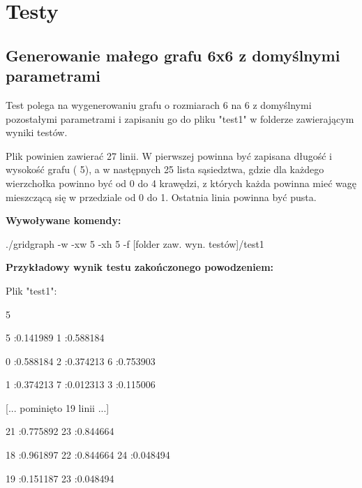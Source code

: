 \documentclass[11pt,a4paper]{report}
\def\console #1{\begingroup\fontfamily{qcr}\selectfont#1\endgroup}
\newenvironment{multiconsole}{\begingroup\fontfamily{qcr}\selectfont}{\endgroup}
\begin{document}
    \chapter{Testy}
    


    \newpage
    \section{Generowanie małego grafu 6x6 z domyślnymi parametrami}

    Test polega na wygenerowaniu grafu o rozmiarach 6 na 6 z domyślnymi pozostałymi parametrami i zapisaniu go do pliku "test1" w folderze zawierającym wyniki testów. 
    
    Plik powinien zawierać 27 linii. W pierwszej powinna być zapisana długość i wysokość grafu (\console{5 5}), a w następnych 25 lista sąsiedztwa, gdzie dla każdego wierzchołka powinno być od 0 do 4 krawędzi, z których każda powinna mieć wagę mieszczącą się w przedziale od 0 do 1. Ostatnia linia powinna być pusta.

    \vspace{2em}

    \textbf{Wywoływane komendy:}

    \vspace{1em}

    \begin{multiconsole}
        ./gridgraph -w -xw 5 -xh 5 -f [folder zaw. wyn. testów]/test1
    \end{multiconsole}

    \vspace{2em}

    \textbf{Przykładowy wynik testu zakończonego powodzeniem:}

    \vspace{1em}

    Plik "test1":

    \begin{multiconsole}
        5 5

        \hspace{2em}5 :0.141989  1 :0.588184 

        \hspace{2em}0 :0.588184  2 :0.374213  6 :0.753903 

        \hspace{2em}1 :0.374213  7 :0.012313  3 :0.115006 

        [... pominięto 19 linii ...]

        \hspace{2em}21 :0.775892  23 :0.844664 

        \hspace{2em}18 :0.961897  22 :0.844664  24 :0.048494 

        \hspace{2em}19 :0.151187  23 :0.048494
    \end{multiconsole}
\end{document}
